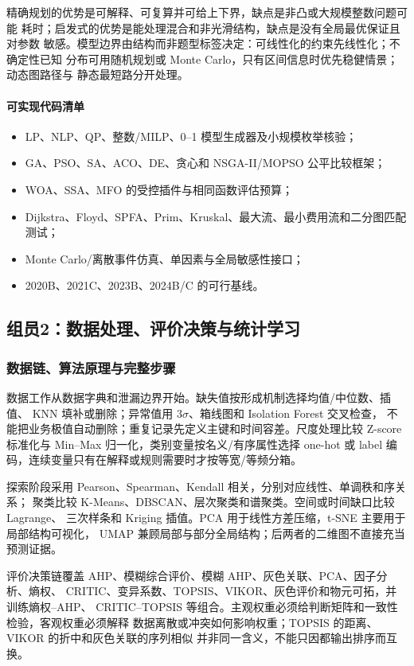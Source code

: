 \documentclass[UTF8,a4paper,12pt]{ctexart}
\begin{document}
精确规划的优势是可解释、可复算并可给上下界，缺点是非凸或大规模整数问题可能
耗时；启发式的优势是能处理混合和非光滑结构，缺点是没有全局最优保证且对参数
敏感。模型边界由结构而非题型标签决定：可线性化的约束先线性化；不确定性已知
分布可用随机规划或 Monte Carlo，只有区间信息时优先稳健情景；动态图路径与
静态最短路分开处理。

\paragraph{可实现代码清单}
\begin{itemize}
  \item LP、NLP、QP、整数/MILP、0--1 模型生成器及小规模枚举核验；
  \item GA、PSO、SA、ACO、DE、贪心和 NSGA-II/MOPSO 公平比较框架；
  \item WOA、SSA、MFO 的受控插件与相同函数评估预算；
  \item Dijkstra、Floyd、SPFA、Prim、Kruskal、最大流、最小费用流和二分图匹配测试；
  \item Monte Carlo/离散事件仿真、单因素与全局敏感性接口；
  \item 2020B、2021C、2023B、2024B/C 的可行基线。
\end{itemize}

\subsection{组员2：数据处理、评价决策与统计学习}

\subsubsection{数据链、算法原理与完整步骤}

数据工作从数据字典和泄漏边界开始。缺失值按形成机制选择均值/中位数、插值、
KNN 填补或删除；异常值用 $3\sigma$、箱线图和 Isolation Forest 交叉检查，
不能把业务极值自动删除；重复记录先定义主键和时间容差。尺度处理比较
Z-score 标准化与 Min--Max 归一化，类别变量按名义/有序属性选择 one-hot 或
label 编码，连续变量只有在解释或规则需要时才按等宽/等频分箱。

探索阶段采用 Pearson、Spearman、Kendall 相关，分别对应线性、单调秩和序关系；
聚类比较 K-Means、DBSCAN、层次聚类和谱聚类。空间或时间缺口比较 Lagrange、
三次样条和 Kriging 插值。PCA 用于线性方差压缩，t-SNE 主要用于局部结构可视化，
UMAP 兼顾局部与部分全局结构；后两者的二维图不直接充当预测证据。

评价决策链覆盖 AHP、模糊综合评价、模糊 AHP、灰色关联、PCA、因子分析、熵权、
CRITIC、变异系数、TOPSIS、VIKOR、灰色评价和物元可拓，并训练熵权--AHP、
CRITIC--TOPSIS 等组合。主观权重必须给判断矩阵和一致性检验，客观权重必须解释
数据离散或冲突如何影响权重；TOPSIS 的距离、VIKOR 的折中和灰色关联的序列相似
并非同一含义，不能只因都输出排序而互换。
\end{document}
